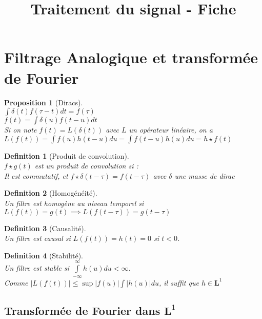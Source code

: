 \documentclass[a4paper]{article}
\title{Traitement du signal - Fiche}
\date{}
\newtheorem*{prop}{Proposition}
\newtheorem*{definition}{Definition}
\renewcommand{\leq}{\leqslant}
\renewcommand{\(}{\left(}
\renewcommand{\)}{\right)}
\begin{document}
\maketitle

\section{Filtrage Analogique et transformée de Fourier}

\begin{prop}[Diracs]~\\
  $\int \delta(t)f(\tau-t)dt = f(\tau)$\\
  $f(t) = \int \delta(u)f(t-u)dt$\\
   Si on note $f(t) = L(\delta(t))$ avec $L$ un opérateur linéaire, on a\\
  $L(f(t)) = \int f(u)h(t-u)du = \int f(t-u)h(u)du = h \star f(t)$
\end{prop}


\begin{definition}[Produit de convolution]~\\
  $f \star g(t)$ est un produit de convolution si :\\
  Il est commutatif, et $f \star \delta(t - \tau) = f(t - \tau)$ avec $\delta$
  une masse de dirac
\end{definition}

\begin{definition}[Homogénéité]~\\
  Un filtre est homogène au niveau temporel si $L(f(t)) = g(t) \implies
  L(f(t-\tau)) = g(t-\tau)$
\end{definition}

\begin{definition}[Causalité]~\\
  Un filtre est causal si $L(f(t)) = h(t) = 0$ si $t<0$.
\end{definition}


\begin{definition}[Stabilité]~\\
  Un filtre est stable si $\int\limits_{-\infty}^{\infty}h(u)du < \infty$.\\
  Comme $|L(f(t))| \leq \sup |f(u)| \int |h(u)| du$, il suffit que $h \in \mathbf{L}^1$
\end{definition}


\subsection{Transformée de Fourier dans $\mathbf{L}^1$}
\end{document}
